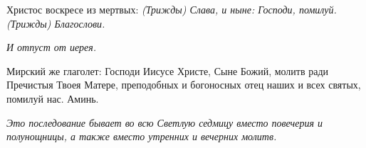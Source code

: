\normalfont{}Христос воскресе из мертвых: \itshape (Трижды\normalfont{}) Слава, и ныне: Господи, помилуй. (\itshape Трижды\normalfont{}) Благослови. 

\itshape И отпуст от иерея. 



Мирский же глаголе\normalfont{}т: Господи Иисусе Христе, Сыне Божий, молитв ради Пречистыя Твоея Матере, преподобных и богоносных отец наших и всех святых, помилуй нас. Аминь. 





\itshape  *Это последование бывает во всю Светлую седмицу вместо повечерия и полунощницы, а также вместо утренних и вечерних молитв.\normalfont{}

\mychapterending